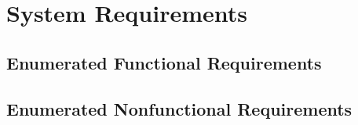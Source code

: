 \chapter{System Requirements}

\section{Enumerated Functional Requirements}

\section{Enumerated Nonfunctional Requirements}